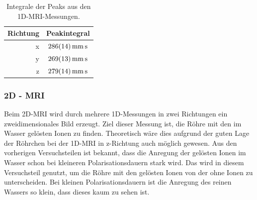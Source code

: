 \documentclass[../../main.tex]{subfiles}
\begin{document}
        \begin{table}[H]
            \centering
            \begin{tabular}{r|c}
            Richtung & Peakintegral                            \\ \hline
            x        & $\SI{286 +- 14}{\milli \metre \second}$ \\
            y        & $\SI{269 +- 13}{\milli \metre \second}$ \\
            z        & $\SI{279 +- 14}{\milli \metre \second}$
            \end{tabular}
            \caption{Integrale der Peaks aus den 1D-MRI-Messungen.}
            \label{tab:MRI_1D_Integrale}
        \end{table}
        
    \subsubsection{2D - MRI}
        Beim 2D-MRI wird durch mehrere 1D-Messungen in zwei Richtungen ein zweidimensionales Bild erzeugt. Ziel dieser Messung ist, die Röhre mit den im Wasser gelösten Ionen zu finden. Theoretisch wäre dies aufgrund der guten Lage der Röhrchen bei der 1D-MRI in z-Richtung auch möglich gewesen. Aus den vorherigen Versuchsteilen ist bekannt, dass die Anregung der gelösten Ionen im Wasser schon bei kleineren Polarisationsdauern stark wird. Das wird in diesem Versuchsteil genutzt, um die Röhre mit den gelösten Ionen von der ohne Ionen zu unterscheiden. Bei kleinen Polarisationsdauern ist die Anregung des reinen Wassers so klein, dass dieses kaum zu sehen ist. 
\end{document}
